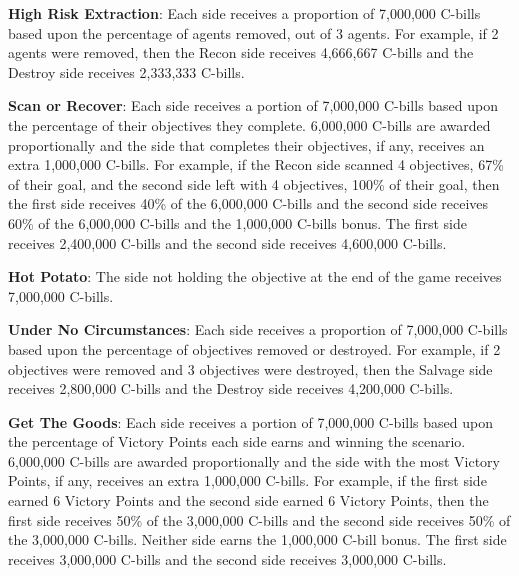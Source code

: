 \begin{description}
\item {\bfseries High Risk Extraction}: Each side receives a proportion of 7,000,000 C-bills based upon the percentage of agents removed, out of 3 agents.
For example, if 2 agents were removed, then the Recon side receives 4,666,667 C-bills and the Destroy side receives 2,333,333 C-bills.

\item {\bfseries Scan or Recover}: Each side receives a portion of 7,000,000 C-bills based upon the percentage of their objectives they complete.
6,000,000 C-bills are awarded proportionally and the side that completes their objectives, if any, receives an extra 1,000,000 C-bills.
For example, if the Recon side scanned 4 objectives, 67\% of their goal, and the second side left with 4 objectives, 100\% of their goal, then the first side receives 40\% of the 6,000,000 C-bills and the second side receives 60\% of the 6,000,000 C-bills and the 1,000,000 C-bills bonus.
The first side receives 2,400,000 C-bills and the second side receives 4,600,000 C-bills.

\item {\bfseries Hot Potato}: The side not holding the objective at the end of the game receives 7,000,000 C-bills.

\item {\bfseries Under No Circumstances}: Each side receives a proportion of 7,000,000 C-bills based upon the percentage of objectives removed or destroyed.
For example, if 2 objectives were removed and 3 objectives were destroyed, then the Salvage side receives 2,800,000 C-bills and the Destroy side receives 4,200,000 C-bills.

\item {\bfseries Get The Goods}: Each side receives a portion of 7,000,000 C-bills based upon the percentage of Victory Points each side earns and winning the scenario.
6,000,000 C-bills are awarded proportionally and the side with the most Victory Points, if any, receives an extra 1,000,000 C-bills.
For example, if the first side earned 6 Victory Points and the second side earned 6 Victory Points, then the first side receives 50\% of the 3,000,000 C-bills and the second side receives 50\% of the 3,000,000 C-bills.
Neither side earns the 1,000,000 C-bill bonus.
The first side receives 3,000,000 C-bills and the second side receives 3,000,000 C-bills.

\end{description}
